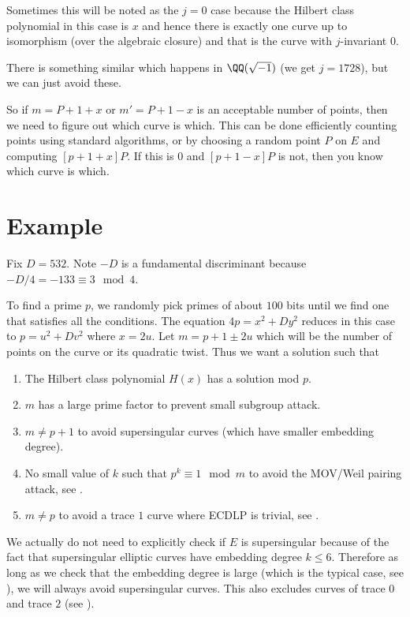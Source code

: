 \documentclass[11pt]{article}
\begin{document}
\begin{description}
\begin{warn}
		Sometimes this will be noted as the $j=0$ case because the Hilbert class polynomial in this case is $x$ and hence there is exactly one curve up to isomorphism (over the algebraic closure) and that is the curve with $j$-invariant $0$.
		
		There is something similar which happens in $\QQ(\sqrt{-1})$ (we get $j=1728$), but we can just avoid these.
	\end{warn}
	
	So if $m = P + 1 + x$ or $m' = P + 1 - x$ is an acceptable number of points, then we need to figure out which curve is which. This can be done efficiently counting points using standard algorithms, or by choosing a random point $P$ on $E$ and computing $[p+1+x]P$. If this is $0$ and $[p+1-x]P$ is not, then you know which curve is which.
\end{description}


\section{Example}

Fix $D = 532$. Note $-D$ is a fundamental discriminant because $-D/4 = -133 \equiv 3\mod{4}$.

To find a prime $p$, we randomly pick primes of about $100$ bits until we find one that satisfies all the conditions. The equation $4p = x^2 + Dy^2$ reduces in this case to $p = u^2 + Dv^2$ where $x = 2u$. Let $m = p + 1 \pm 2u$ which will be the number of points on the curve or its quadratic twist. Thus we want a solution such that
\begin{enumerate}[$\bullet$]
	\item The Hilbert class polynomial $H(x)$ has a solution mod $p$.
	\item $m$ has a large prime factor to prevent small subgroup attack.
	\item $m \neq p+1$ to avoid supersingular curves (which have smaller embedding degree).
	\item No small value of $k$ such that $p^k\equiv 1\mod{m}$ to avoid the MOV/Weil pairing attack, see \cite[Pg.~169]{hankerson2004guide}.
	\item $m\neq p$ to avoid a trace $1$ curve where ECDLP is trivial, see \cite{nigel1997trace1}.
\end{enumerate}
\begin{rem}
	We actually do not need to explicitly check if $E$ is supersingular because of the fact that supersingular elliptic curves have embedding degree $k\leq 6$. Therefore as long as we check that the embedding degree is large (which is the typical case, see \cite[Rem.~XI.6.3, Pg.~388]{silverman2009arithmetic}), we will always avoid supersingular curves. This also excludes curves of trace $0$ and trace $2$ (see \cite[Ch.~V.7]{blake1999elliptic}).
\end{rem}
\end{document}
